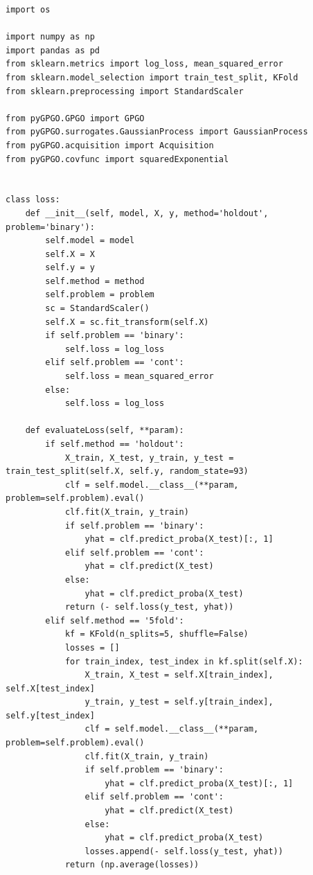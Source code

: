 \documentclass[10pt,a4paper,twoside]{book}
\begin{document}
\begin{verbatim}
import os

import numpy as np
import pandas as pd
from sklearn.metrics import log_loss, mean_squared_error
from sklearn.model_selection import train_test_split, KFold
from sklearn.preprocessing import StandardScaler

from pyGPGO.GPGO import GPGO
from pyGPGO.surrogates.GaussianProcess import GaussianProcess
from pyGPGO.acquisition import Acquisition
from pyGPGO.covfunc import squaredExponential


class loss:
    def __init__(self, model, X, y, method='holdout', problem='binary'):
        self.model = model
        self.X = X
        self.y = y
        self.method = method
        self.problem = problem
        sc = StandardScaler()
        self.X = sc.fit_transform(self.X)
        if self.problem == 'binary':
            self.loss = log_loss
        elif self.problem == 'cont':
            self.loss = mean_squared_error
        else:
            self.loss = log_loss

    def evaluateLoss(self, **param):
        if self.method == 'holdout':
            X_train, X_test, y_train, y_test = train_test_split(self.X, self.y, random_state=93)
            clf = self.model.__class__(**param, problem=self.problem).eval()
            clf.fit(X_train, y_train)
            if self.problem == 'binary':
                yhat = clf.predict_proba(X_test)[:, 1]
            elif self.problem == 'cont':
                yhat = clf.predict(X_test)
            else:
                yhat = clf.predict_proba(X_test)
            return (- self.loss(y_test, yhat))
        elif self.method == '5fold':
            kf = KFold(n_splits=5, shuffle=False)
            losses = []
            for train_index, test_index in kf.split(self.X):
                X_train, X_test = self.X[train_index], self.X[test_index]
                y_train, y_test = self.y[train_index], self.y[test_index]
                clf = self.model.__class__(**param, problem=self.problem).eval()
                clf.fit(X_train, y_train)
                if self.problem == 'binary':
                    yhat = clf.predict_proba(X_test)[:, 1]
                elif self.problem == 'cont':
                    yhat = clf.predict(X_test)
                else:
                    yhat = clf.predict_proba(X_test)
                losses.append(- self.loss(y_test, yhat))
            return (np.average(losses))



\end{verbatim}
\end{document}
